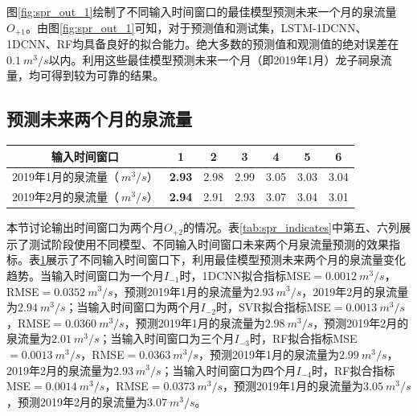 图\ref{fig:spr_out_1}绘制了不同输入时间窗口的最佳模型预测未来一个月的泉流量$O_{+1}$。由图\ref{fig:spr_out_1}可知，对于预测值和测试集，LSTM-1DCNN、1DCNN、RF均具备良好的拟合能力。绝大多数的预测值和观测值的绝对误差在$\SI{0.1}{m^{3}/s}$以内。利用这些最佳模型预测未来一个月（即2019年1月）龙子祠泉流量，均可得到较为可靠的结果。

\subsection{预测未来两个月的泉流量}\label{sec:spr_two}

\begin{table}[!htbp]
  \centering
  \label{tab:spr_two}
  \footnotesize
  \begin{tabular}{ccccccc}
    \toprule
    输入时间窗口 & 1 & 2 & 3 & 4 & 5 & 6\\
    \midrule
    2019年1月的泉流量（$\SI{}{m^{3}/s}$）& \textbf{2.93} & 2.98 & 2.99 & 3.05 & 3.03 & 3.04 \\
    2019年2月的泉流量（$\SI{}{m^{3}/s}$）& \textbf{2.94} & 2.91 & 2.93 & 3.07 & 3.04 & 3.01 \\
    \bottomrule
  \end{tabular}
\end{table}

本节讨论输出时间窗口为两个月$O_{+2}$的情况。表\ref{tab:spr_indicates}中第五、六列展示了测试阶段使用不同模型、不同输入时间窗口未来两个月泉流量预测的效果指标。表\ref{tab:spr_two}展示了不同输入时间窗口下，利用最佳模型预测未来两个月的泉流量变化趋势。当输入时间窗口为一个月$I_{-1}$时，1DCNN拟合指标MSE$=\SI{0.0012}{m^{3}/s}$，RMSE$=\SI{0.0352}{m^{3}/s}$，预测2019年1月的泉流量为$\SI{2.93}{m^{3}/s}$，2019年2月的泉流量为$\SI{2.94}{m^{3}/s}$；当输入时间窗口为两个月$I_{-2}$时，SVR拟合指标MSE$=\SI{0.0013}{m^{3}/s}$，RMSE$=\SI{0.0360}{m^{3}/s}$，预测2019年1月的泉流量为$\SI{2.98}{m^{3}/s}$，预测2019年2月的泉流量为$\SI{2.01}{m^{3}/s}$；当输入时间窗口为三个月$I_{-3}$时，RF拟合指标MSE$=\SI{0.0013}{m^{3}/s}$，RMSE$=\SI{0.0363}{m^{3}/s}$，预测2019年1月的泉流量为$\SI{2.99}{m^{3}/s}$，2019年2月的泉流量为$\SI{2.93}{m^{3}/s}$；当输入时间窗口为四个月$I_{-4}$时，RF拟合指标MSE$=\SI{0.0014}{m^{3}/s}$，RMSE$=\SI{0.0373}{m^{3}/s}$，预测2019年1月的泉流量为$\SI{3.05}{m^{3}/s}$，预测2019年2月的泉流量为$\SI{3.07}{m^{3}/s}$。

